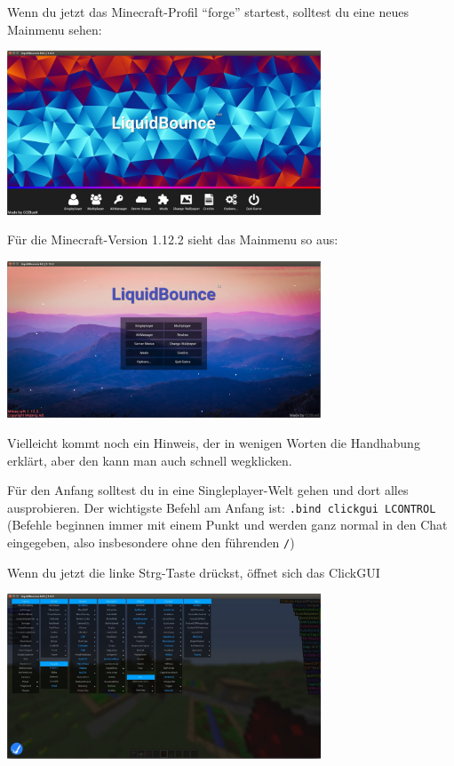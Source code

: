 Wenn du jetzt das Minecraft-Profil “forge” startest, solltest du eine neues Mainmenu sehen:

\includegraphics[width=0.7\textwidth, center]{TeX_files/pics/erster_start_1_8.jpg}

Für die Minecraft-Version 1.12.2 sieht das Mainmenu so aus:

\includegraphics[width=0.7\textwidth, center]{TeX_files/pics/erster_start_1_12.jpg}

Vielleicht kommt noch ein Hinweis, der in wenigen Worten die Handhabung erklärt, aber den kann man auch schnell wegklicken.

Für den Anfang solltest du in eine Singleplayer-Welt gehen und dort alles ausprobieren. Der wichtigste Befehl am Anfang ist: \texttt{.bind clickgui LCONTROL} (Befehle beginnen immer mit einem Punkt und werden ganz normal in den Chat eingegeben, also insbesondere ohne den führenden \texttt{/})

Wenn du jetzt die linke Strg-Taste drückst, öffnet sich das ClickGUI

\includegraphics[width=0.7\textwidth, center]{TeX_files/pics/clickgui.jpg}

